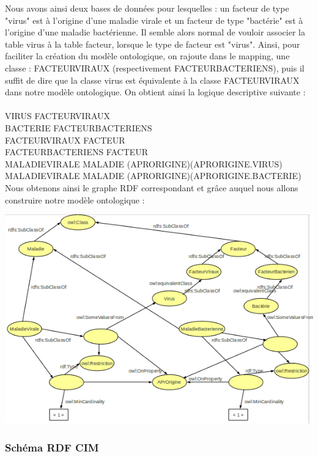 \documentclass[12pt]{article}
\begin{document}
\indent Nous avons ainsi deux bases de données pour lesquelles : un facteur de type "virus" est à l'origine d'une maladie virale et un facteur de type "bactérie" est à l'origine d'une maladie bactérienne. Il semble alors normal de vouloir associer la table virus à la table facteur, lorsque le type de facteur est "virus". Ainsi, pour faciliter la création du modèle ontologique, on rajoute dans le mapping, une classe : FACTEURVIRAUX (respectivement FACTEURBACTERIENS), puis il suffit de dire que la classe virus est équivalente à la classe FACTEURVIRAUX dans notre modèle ontologique. On obtient ainsi la logique descriptive suivante : 
\\
\\
	VIRUS \subseteq FACTEURVIRAUX \\
	BACTERIE \subseteq FACTEURBACTERIENS \\
	FACTEURVIRAUX \subseteq FACTEUR \\
	FACTEURBACTERIENS \subseteq FACTEUR \\ 
	MALADIEVIRALE \subseteq MALADIE \cap (\geq APRORIGINE)(\exists APRORIGINE.VIRUS) \\
 	MALADIEVIRALE \subseteq MALADIE \cap (\geq APRORIGINE)(\exists APRORIGINE.BACTERIE) \\

\indent Nous obtenons ainsi le graphe RDF correspondant et grâce auquel nous allons construire notre modèle ontologique :

\begin{center}
	\includegraphics[scale=0.70]{images/rdf-schema.png}
\end{center}

\subsubsection{Schéma RDF CIM}
\end{document}
